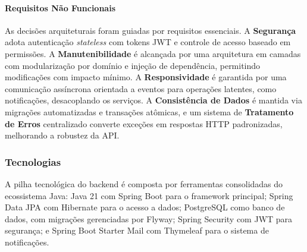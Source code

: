 \documentclass[portuguese]{sbc2025}%
\begin{document}
\paragraph{Requisitos Não Funcionais} As decisões arquiteturais foram guiadas por requisitos essenciais. A \textbf{Segurança} adota autenticação \textit{stateless} com tokens JWT e controle de acesso baseado em permissões. A \textbf{Manutenibilidade} é alcançada por uma arquitetura em camadas com modularização por domínio e injeção de dependência, permitindo modificações com impacto mínimo. A \textbf{Responsividade} é garantida por uma comunicação assíncrona orientada a eventos para operações latentes, como notificações, desacoplando os serviços. A \textbf{Consistência de Dados} é mantida via migrações automatizadas e transações atômicas, e um sistema de \textbf{Tratamento de Erros} centralizado converte exceções em respostas HTTP padronizadas, melhorando a robustez da API.

\subsubsection{Tecnologias}
A pilha tecnológica do backend é composta por ferramentas consolidadas do ecossistema Java: Java 21 com Spring Boot para o framework principal; Spring Data JPA com Hibernate para o acesso a dados; PostgreSQL como banco de dados, com migrações gerenciadas por Flyway; Spring Security com JWT para segurança; e Spring Boot Starter Mail com Thymeleaf para o sistema de notificações.

\end{document}
